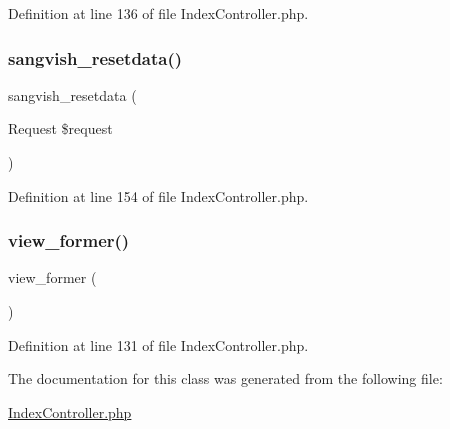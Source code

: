 Definition at line 136 of file Index\+Controller.\+php.

\mbox{\label{class_responsive_1_1_http_1_1_controllers_1_1_index_controller_a568f54518a6e52040cae2ff9e0316a28}} 
\subsubsection{\texorpdfstring{sangvish\_resetdata()}{sangvish\_resetdata()}}
{\footnotesize\ttfamily sangvish\+\_\+resetdata (\begin{DoxyParamCaption}\item[{Request}]{\$request }\end{DoxyParamCaption})}



Definition at line 154 of file Index\+Controller.\+php.

\mbox{\label{class_responsive_1_1_http_1_1_controllers_1_1_index_controller_aac46d13297bfa2039955bbd50d414ec0}} 
\subsubsection{\texorpdfstring{view\_former()}{view\_former()}}
{\footnotesize\ttfamily view\+\_\+former (\begin{DoxyParamCaption}{ }\end{DoxyParamCaption})}



Definition at line 131 of file Index\+Controller.\+php.



The documentation for this class was generated from the following file\+:\begin{DoxyCompactItemize}
\item 
\mbox{\hyperlink{_index_controller_8php}{Index\+Controller.\+php}}\end{DoxyCompactItemize}
